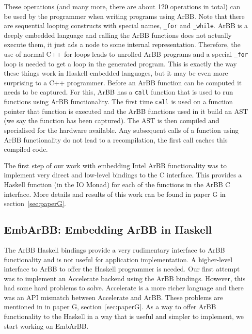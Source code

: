 \documentclass[a4paper]{book}
\begin{document}
These operations (and many more, there are about 120 operations in total) can be used 
by the programmer when writing programs using ArBB. Note that there are sequential looping 
constructs with special names, {\tt \_for} and {\tt \_while}. ArBB is a deeply embedded 
language and calling the ArBB functions does not actually execute them, it just ads a node to 
some internal representation. Therefore, the use of normal C++ for loops leads to unrolled 
ArBB programs and a special {\tt \_for} loop is needed to get a loop in the generated program. 
This is exactly the way these things work in Haskell embedded languages, but it may be even 
more surprising to a C++ programmer. Before an ArBB function can be computed it needs to be 
captured. For this, ArBB has a {\tt call} function that is used to run functions using ArBB 
functionality. The first time {\tt call} is used on a function pointer that function is 
executed and the ArBB functions used in it build an AST (we say the function has been 
captured). The AST is then compiled and specialised for the hardware available. Any 
subsequent calls of a function using ArBB functionality do not lead to a recompilation, 
the first call caches this compiled code. 

The first step of our work with embedding Intel ArBB functionality was to implement very direct 
and low-level bindings to the C interface. This provides a Haskell function (in the IO Monad) 
for each of the functions in the ArBB C interface. More details and results of this work 
can be found in paper G in section~\ref{sec:paperG}.



\subsection{EmbArBB: Embedding ArBB in Haskell}
\label{sec:EmbArBB} 

The ArBB Haskell bindings provide a very rudimentary interface to ArBB functionality and 
is not useful for application implementation. A higher-level interface to ArBB to offer 
the Haskell programmer is needed. Our first attempt was to implement an Accelerate backend 
using the ArBB bindings. However, this had some hard problems to solve. Accelerate is a 
more richer language and there was an API mismatch between Accelerate and ArBB. These problems 
are mentioned in in paper G, section~\ref{sec:paperG}. As a way to offer ArBB functionality 
to the Haskell in a way that is useful and simpler to implement, we start working on EmbArBB. 
\end{document}

